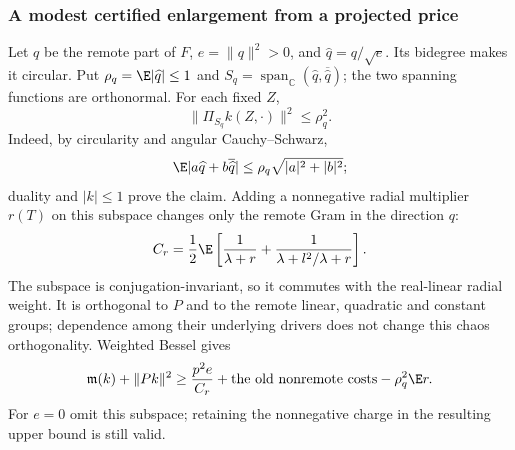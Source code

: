 \subsubsection{A modest certified enlargement from a projected price}
\label{sec:projected-remote-price}
Let $q$ be the remote part of $F$, $e=\|q\|^2>0$, and
$\widehat q=q/\sqrt e$. Its bidegree makes it circular. Put
$\rho_q=\E|\widehat q|\le1$ and
$S_q=\operatorname{span}_{\mathbb C}(\widehat q,\overline{\widehat q})$;
the two spanning functions are orthonormal. For each fixed $Z$,
\[
 \|\Pi_{S_q}k(Z,\cdot)\|^2\le\rho_q^2.
\]
Indeed, by circularity and angular Cauchy--Schwarz,
\[
 \E|a\widehat q+b\overline{\widehat q}|
 \le\rho_q\sqrt{|a|^2+|b|^2};
\]
duality and $|k|\le1$ prove the claim.
Adding a nonnegative radial multiplier $r(T)$ on this subspace changes
only the remote Gram in the direction $q$:
\[
 C_r=\frac12\E\left[
 \frac1{\lambda+r}+\frac1{\lambda+l^2/\lambda+r}\right].
\]
The subspace is conjugation-invariant, so it commutes with the
real-linear radial weight. It is orthogonal to $P$ and to the remote
linear, quadratic and constant groups; dependence among their underlying
drivers does not change this chaos orthogonality. Weighted Bessel gives
\[
 \mathfrak m(k)+\|Pk\|^2\ge
 \frac{p^2e}{C_r}+\text{the old nonremote costs}-\rho_q^2\E r.
\]
For $e=0$ omit this subspace; retaining the nonnegative charge in the
resulting upper bound is still valid.

